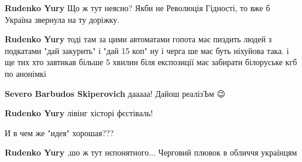 \begin{itemize}
\begin{itemize}
\textbf{Rudenko Yury} Що ж тут неясно? Якби не Революція Гідності, то вже б Україна звернула на ту доріжку.

 
\textbf{Rudenko Yury} тоді там за цими автоматами гопота має пиздить людей з подкатами "дай закурить" і "дай 15 коп" ну і черга ше має буть ніхуйова така. і ще тих хто завтикав більше 5 хвилин біля експозиції має забирати білоруське кгб по анонімкі

 
\textbf{Severo Barbudos Skiperovich} дааааа! Дайош реалізЪм 😉

 
\textbf{Rudenko Yury} лівінг хісторі фєстіваль!

 
И в чем же "идея" хорошая???

 
\textbf{Rudenko Yury} ,шо ж тут нєпонятного...
Черговий плювок в обличчя українцям

 

\end{itemize}
\end{itemize}
